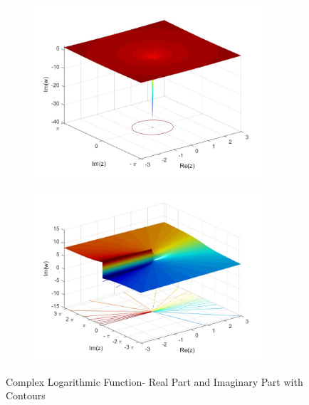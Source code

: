 \documentclass[a4paper,11pt]{article}
\begin{document}
\begin{figure}[!h]
\begin{subfigure}[c]{0.5\textwidth}
\includegraphics[width=8.5cm]{plot3_log.jpeg}
\end{subfigure}
\begin{subfigure}[c]{0.5\textwidth}
\includegraphics[width=8.5cm]{plot4_log.jpeg}
\end{subfigure}
\caption{Complex Logarithmic Function- Real Part and Imaginary Part with Contours}
\label{logcont12}
\end{figure}
\end{document}
